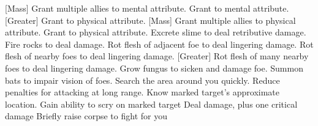 [Mass]
    {Grant multiple allies  to mental attribute.}
    {Grant  to mental attribute.}
[Greater]
    {Grant  to physical attribute.}
[Mass]
    {Grant multiple allies  to physical attribute.}
    {Grant  to physical attribute.}
    {Excrete slime to deal retributive damage.}
    {Fire rocks to deal damage.}
    {Rot flesh of adjacent foe to deal lingering damage.}
    {Rot flesh of nearby foes to deal lingering damage.}
[Greater]
    {Rot flesh of many nearby foes to deal lingering damage.}
    {Grow fungus to sicken and damage foe.}
    {Summon bats to impair vision of foes.}
    {Search the area around you quickly.}
    {Reduce penalties for attacking at long range.}
    {Know marked target's approximate location.}
    {Gain ability to scry on marked target}
    {Deal damage, plus one critical damage}
    {Briefly raise corpse to fight for you}
